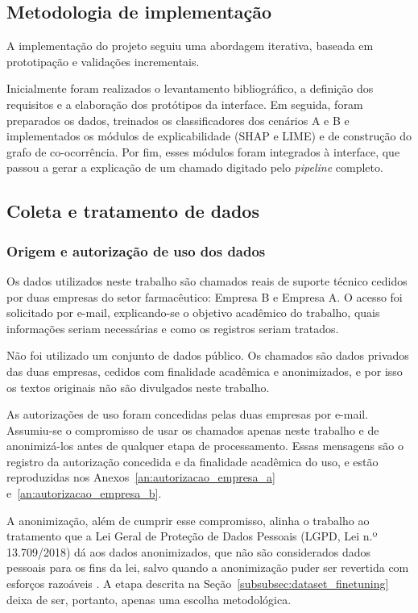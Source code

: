 \documentclass[
    12pt,                %
    openright,           %
    oneside,             %
    a4paper,             %
    english,             %
    brazil               %
]{abntex2}
\begin{document}
\subsection{Metodologia de implementação}

A implementação do projeto seguiu uma abordagem iterativa, baseada em 
prototipação e validações incrementais.

Inicialmente foram realizados o levantamento bibliográfico, a 
definição dos requisitos e a elaboração dos protótipos da interface. 
Em seguida, foram preparados os dados, treinados os classificadores 
dos cenários A e B e implementados os módulos de explicabilidade 
(SHAP e LIME) e de construção do grafo de co-ocorrência. Por fim, 
esses módulos foram integrados à interface, que passou a gerar a 
explicação de um chamado digitado pelo \textit{pipeline} completo.

\subsection{Coleta e tratamento de dados}
\subsubsection{Origem e autorização de uso dos dados}
\label{subsubsec:autorizacao_dados}

Os dados utilizados neste trabalho são chamados reais de suporte
técnico cedidos por duas empresas do setor farmacêutico: Empresa B e Empresa A. O acesso foi solicitado por e-mail, explicando-se o objetivo acadêmico do trabalho, quais
informações seriam necessárias e como os registros seriam tratados.

Não foi utilizado um conjunto de dados público. Os chamados são dados privados das duas empresas, cedidos com finalidade acadêmica e anonimizados, e por isso os textos originais não são divulgados neste trabalho.

As autorizações de uso foram concedidas pelas duas empresas por e-mail.
Assumiu-se o compromisso de usar os chamados apenas neste trabalho e de
anonimizá-los antes de qualquer etapa de processamento. Essas mensagens
são o registro da autorização concedida e da finalidade acadêmica do uso, e estão
reproduzidas nos Anexos~\ref{an:autorizacao_empresa_a}
e~\ref{an:autorizacao_empresa_b}.

A anonimização, além de cumprir esse compromisso, alinha o trabalho ao
tratamento que a Lei Geral de Proteção de Dados Pessoais (LGPD, Lei
n.º 13.709/2018) dá aos dados anonimizados, que não são considerados
dados pessoais para os fins da lei, salvo quando a anonimização puder
ser revertida com esforços razoáveis \cite{brasil2018}. A etapa
descrita na Seção~\ref{subsubsec:dataset_finetuning} deixa de ser,
portanto, apenas uma escolha metodológica.
\end{document}
